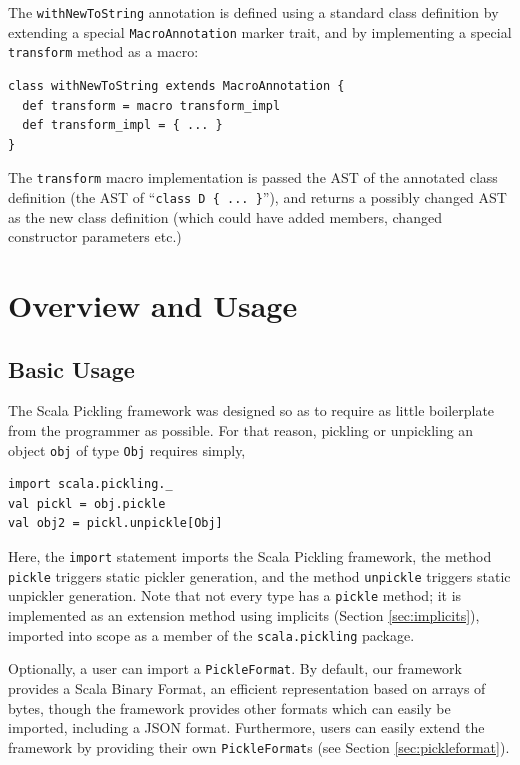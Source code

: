 \documentclass[preprint,10pt]{sigplanconf}
\theoremstyle{definition}
\theoremstyle{definition}
\newcommand{\term}[1]{\mbox{\texttt{#1}}}
\begin{document}
The \verb|withNewToString| annotation is defined using a standard class
definition by extending a special \verb|MacroAnnotation| marker trait, and by
implementing a special \verb|transform| method as a macro:

\begin{lstlisting}
class withNewToString extends MacroAnnotation {
  def transform = macro transform_impl
  def transform_impl = { ... }
}
\end{lstlisting}

The \verb|transform| macro implementation is passed the AST of the annotated class
definition (the AST of ``\verb|class D { ... }|''), and returns a possibly changed AST
as the new class definition (which could have added members, changed
constructor parameters etc.)

\section{Overview and Usage}
\label{sec:overview}

\subsection{Basic Usage}

The Scala Pickling framework was designed so as to require as little
boilerplate from the programmer as possible. For that reason, pickling or
unpickling an object \term{obj} of type \term{Obj} requires simply,

\begin{lstlisting}
import scala.pickling._
val pickl = obj.pickle
val obj2 = pickl.unpickle[Obj]
\end{lstlisting}

Here, the \term{import} statement imports the Scala Pickling framework,
the method \term{pickle} triggers static pickler generation, and the
method \term{unpickle} triggers static unpickler generation. Note that not
every type has a \term{pickle} method; it is implemented as an extension
method using implicits (Section \ref{sec:implicits}), imported into scope as a
member of the \term{scala.pickling} package.

Optionally, a user can
import a \term{PickleFormat}. By default, our framework provides a
Scala Binary Format, an efficient representation based on arrays of bytes,
though the framework provides other formats which can easily be imported,
including a JSON format. Furthermore, users can easily extend the framework by
providing their own \term{PickleFormat}s (see Section \ref{sec:pickleformat}).
\end{document}

